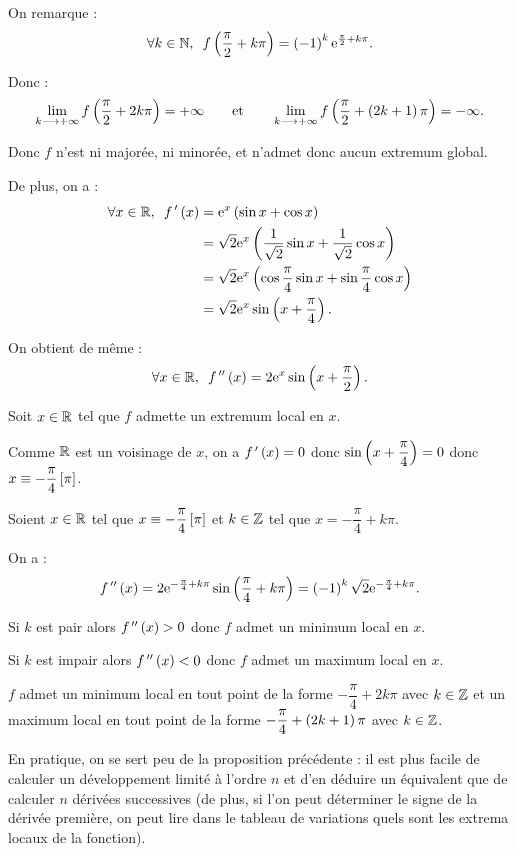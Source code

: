 \begin{corr}
On remarque : \[\quantifs{\forall k\in\N}f\paren{\dfrac{\pi}{2}+k\pi}=\paren{-1}^k\e{\frac{\pi}{2}+k\pi}.\]

Donc : \[\lim_{k\longrightarrow+\infty}f\left(\dfrac{\pi}{2}+2k\pi\right)=+\infty\qquad\text{et}\qquad\lim_{k\longrightarrow+\infty}f\left(\dfrac{\pi}{2}+\left(2k+1\right)\pi\right)=-\infty.\]

Donc \(f\) n'est ni majorée, ni minorée, et n'admet donc aucun extremum global.

De plus, on a : \[\begin{aligned}
\quantifs{\forall x\in\R}f\prim\paren{x}&=\e{x}\paren{\sin x+\cos x} \\
&=\sqrt{2}\e{x}\paren{\dfrac{1}{\sqrt{2}}\sin x+\dfrac{1}{\sqrt{2}}\cos x} \\
&=\sqrt{2}\e{x}\paren{\cos\dfrac{\pi}{4}\sin x+\sin\dfrac{\pi}{4}\cos x} \\
&=\sqrt{2}\e{x}\sin\paren{x+\dfrac{\pi}{4}}.
\end{aligned}\]

On obtient de même : \[\quantifs{\forall x\in\R}f\seconde\paren{x}=2\e{x}\sin\paren{x+\dfrac{\pi}{2}}.\]

\analyse

Soit \(x\in\mathbb{R}\) tel que \(f\) admette un extremum local en \(x\).

Comme \(\mathbb{R}\) est un voisinage de \(x\), on a \(f^{\,\prime}\left(x\right)=0\) donc \(\sin\left(x+\dfrac{\pi}{4}\right)=0\) donc \(x\equiv-\dfrac{\pi}{4}\left[\pi\right]\).

\synthese

Soient \(x\in\mathbb{R}\) tel que \(x\equiv-\dfrac{\pi}{4}\left[\pi\right]\) et \(k\in\mathbb{Z}\) tel que \(x=-\dfrac{\pi}{4}+k\pi\).

On a : \[f^{\,\prime\prime}\left(x\right)=2\mathrm{e}^{-\frac{\pi}{4}+k\pi}\sin\left(\dfrac{\pi}{4}+k\pi\right)=\left(-1\right)^k\sqrt{2}\mathrm{e}^{-\frac{\pi}{4}+k\pi}.\]

Si \(k\) est pair alors \(f^{\,\prime\prime}\left(x\right)>0\) donc \(f\) admet un minimum local en \(x\).

Si \(k\) est impair alors \(f^{\,\prime\prime}\left(x\right)<0\) donc \(f\) admet un maximum local en \(x\).

\conclusion

\(f\) admet un minimum local en tout point de la forme \(-\dfrac{\pi}{4}+2k\pi\) avec \(k\in\mathbb{Z}\) et un maximum local en tout point de la forme \(-\dfrac{\pi}{4}+\left(2k+1\right)\pi\) avec \(k\in\mathbb{Z}\).
\end{corr}

\begin{rem}
En pratique, on se sert peu de la proposition précédente : il est plus facile de calculer un développement limité à l'ordre \(n\) et d'en déduire un équivalent que de calculer \(n\) dérivées successives (de plus, si l'on peut déterminer le signe de la dérivée première, on peut lire dans le tableau de variations quels sont les extrema locaux de la fonction).
\end{rem}

